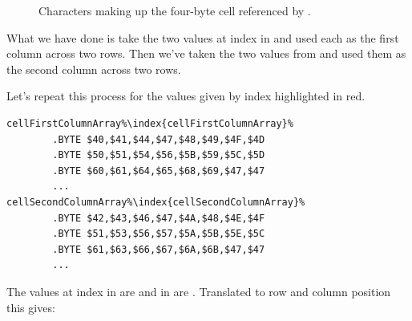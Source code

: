 \begin{figure}[H]                          
{                                          
  \setlength{\tabcolsep}{3.0pt}            
  \setlength\cmidrulewidth{\lightrulewidth}
    \begin{adjustbox}{width=5cm,center}
\begin{subfigure}{0.12\textwidth}

\end{subfigure}
\begin{subfigure}{0.12\textwidth}

\end{subfigure}
    \end{adjustbox}
    \begin{adjustbox}{width=5cm,center}
\begin{subfigure}{0.12\textwidth}

\end{subfigure}
\begin{subfigure}{0.12\textwidth}

\end{subfigure}
    \end{adjustbox}
  }\caption[]{Characters making up the four-byte cell referenced by .}
\end{figure}

What we have done is take the two values at index  in 
and used each as the first column across two rows. Then we've taken the two values from
 and used them as the second column across two rows. 

Let's repeat this process for the values given by index  highlighted in red. 

\begin{lstlisting}[escapechar=\%]
cellFirstColumnArray%\index{cellFirstColumnArray}%
        .BYTE $40,$41,$44,$47,$48,$49,$4F,$4D
        .BYTE $50,$51,$54,$56,$5B,$59,$5C,$5D
        .BYTE $60,$61,$64,$65,$68,$69,$47,$47
        ...
cellSecondColumnArray%\index{cellSecondColumnArray}%   
        .BYTE $42,$43,$46,$47,$4A,$48,$4E,$4F
        .BYTE $51,$53,$56,$57,$5A,$5B,$5E,$5C
        .BYTE $61,$63,$66,$67,$6A,$6B,$47,$47
        ...
\end{lstlisting}

The values at index  in  are  and
in  are . Translated to row and column position
this gives:

